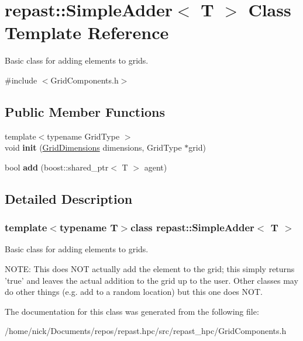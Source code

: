 \hypertarget{classrepast_1_1_simple_adder}{\section{repast\-:\-:Simple\-Adder$<$ T $>$ Class Template Reference}
\label{classrepast_1_1_simple_adder}
}


Basic class for adding elements to grids.  




{\ttfamily \#include $<$Grid\-Components.\-h$>$}

\subsection*{Public Member Functions}
\begin{DoxyCompactItemize}
\item 
\hypertarget{classrepast_1_1_simple_adder_ae09aef02184c1498f6c23bda844ef946}{{\footnotesize template$<$typename Grid\-Type $>$ }\\void {\bfseries init} (\hyperlink{classrepast_1_1_grid_dimensions}{Grid\-Dimensions} dimensions, Grid\-Type $\ast$grid)}\label{classrepast_1_1_simple_adder_ae09aef02184c1498f6c23bda844ef946}

\item 
\hypertarget{classrepast_1_1_simple_adder_a2feb433e1f9889b7b49cf2d0cd461ee7}{bool {\bfseries add} (boost\-::shared\-\_\-ptr$<$ T $>$ agent)}\label{classrepast_1_1_simple_adder_a2feb433e1f9889b7b49cf2d0cd461ee7}

\end{DoxyCompactItemize}


\subsection{Detailed Description}
\subsubsection*{template$<$typename T$>$class repast\-::\-Simple\-Adder$<$ T $>$}

Basic class for adding elements to grids. 

N\-O\-T\-E\-: This does N\-O\-T actually add the element to the grid; this simply returns 'true' and leaves the actual addition to the grid up to the user. Other classes may do other things (e.\-g. add to a random location) but this one does N\-O\-T. 

The documentation for this class was generated from the following file\-:\begin{DoxyCompactItemize}
\item 
/home/nick/\-Documents/repos/repast.\-hpc/src/repast\-\_\-hpc/Grid\-Components.\-h\end{DoxyCompactItemize}
